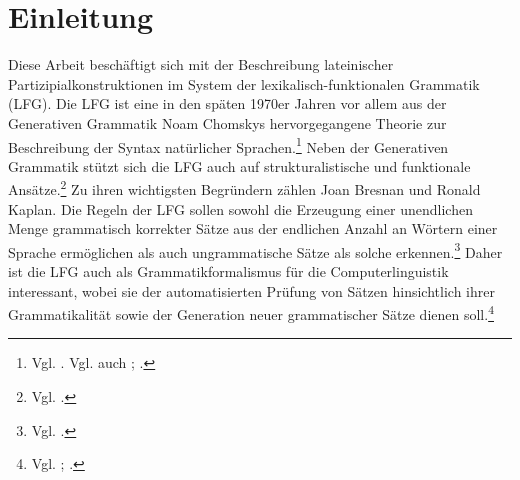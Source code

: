 \documentclass[12pt,a4paper]{article}
\begin{document}

\setcounter{page}{2}
\begingroup
\flushbottom
\begin{spacing}{1.25}
\tableofcontents
\end{spacing}
\thispagestyle{empty}
\pagebreak
\endgroup

\nocite{Menge}
\nocite{LHS}
\nocite{KSt}
\nocite{Rohrer}
\nocite{Skript}
\nocite{Dal}
\nocite{Falk}
\nocite{Bresnan}
\nocite{Snijders}
\nocite{DAZ}



\section{Einleitung}
Diese Arbeit beschäftigt sich mit der Beschreibung lateinischer Partizipialkonstruktionen im System der lexikalisch-funktionalen Grammatik (LFG). Die LFG ist eine in den späten 1970er Jahren vor allem aus der Generativen Grammatik Noam Chomskys hervorgegangene Theorie zur Beschreibung der Syntax natürlicher Sprachen.\footnote{Vgl. \cite[4]{Skript}. Vgl. auch \cite[1]{Dal}; \cite[3]{Bresnan}.} Neben der Generativen Grammatik stützt sich die LFG auch auf strukturalistische und funktionale Ansätze.\footnote{Vgl. \cite[3]{Bresnan}.} Zu ihren wichtigsten Begründern zählen Joan Bresnan und Ronald Kaplan.
Die Regeln der LFG sollen sowohl die Erzeugung einer unendlichen Menge grammatisch korrekter Sätze aus der endlichen Anzahl an Wörtern einer Sprache ermöglichen als auch ungrammatische Sätze als solche erkennen.\footnote{Vgl. \cite[18]{Skript}.} Daher ist die LFG auch als Grammatikformalismus für die Computerlinguistik interessant, wobei sie der automatisierten Prüfung von Sätzen hinsichtlich ihrer Grammatikalität sowie der Generation neuer grammatischer Sätze dienen soll.\footnote{Vgl. \cite[18]{Skript}; \cite[vii]{Bresnan}.}
 
\end{document}
